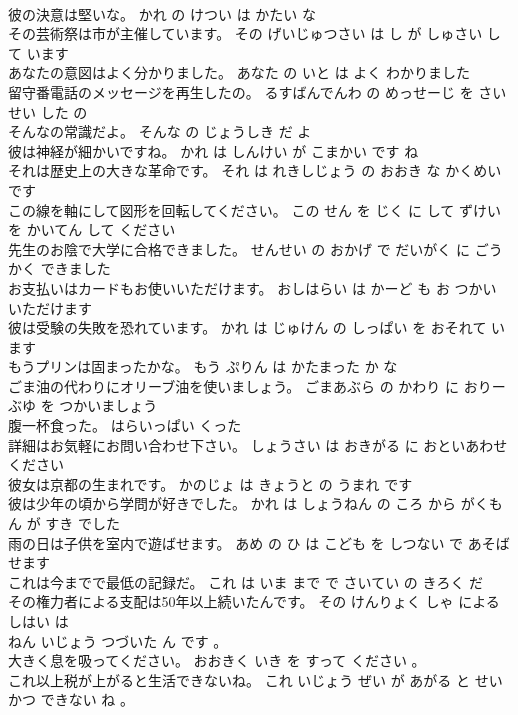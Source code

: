 \documentclass[8pt]{extreport}
\begin{document}
\begin{CJK}{UTF8}{min}
\\	彼の決意は堅いな。	かれ の けつい は かたい な 
\\	その芸術祭は市が主催しています。	その げいじゅつさい は し が しゅさい して います 
\\	あなたの意図はよく分かりました。	あなた の いと は よく わかりました 
\\	留守番電話のメッセージを再生したの。	るすばんでんわ の めっせーじ を さいせい した の 
\\	そんなの常識だよ。	そんな の じょうしき だ よ 
\\	彼は神経が細かいですね。	かれ は しんけい が こまかい です ね 
\\	それは歴史上の大きな革命です。	それ は れきしじょう の おおき な かくめい です 
\\	この線を軸にして図形を回転してください。	この せん を じく に して ずけい を かいてん して ください 
\\	先生のお陰で大学に合格できました。	せんせい の おかげ で だいがく に ごうかく できました 
\\	お支払いはカードもお使いいただけます。	おしはらい は かーど も お つかい いただけます 
\\	彼は受験の失敗を恐れています。	かれ は じゅけん の しっぱい を おそれて います 
\\	もうプリンは固まったかな。	もう ぷりん は かたまった か な 
\\	ごま油の代わりにオリーブ油を使いましょう。	ごまあぶら の かわり に おりーぶゆ を つかいましょう 
\\	腹一杯食った。	はらいっぱい くった 
\\	詳細はお気軽にお問い合わせ下さい。	しょうさい は おきがる に おといあわせ ください 
\\	彼女は京都の生まれです。	かのじょ は きょうと の うまれ です 
\\	彼は少年の頃から学問が好きでした。	かれ は しょうねん の ころ から がくもん が すき でした 
\\	雨の日は子供を室内で遊ばせます。	あめ の ひ は こども を しつない で あそばせます 
\\	これは今までで最低の記録だ。	これ は いま まで で さいてい の きろく だ 
\\	その権力者による支配は50年以上続いたんです。	その けんりょく しゃ による しはい は 
\\	ねん いじょう つづいた ん です 。 
\\	大きく息を吸ってください。	おおきく いき を すって ください 。 
\\	これ以上税が上がると生活できないね。	これ いじょう ぜい が あがる と せいかつ できない ね 。 

\end{CJK}
\end{document}
